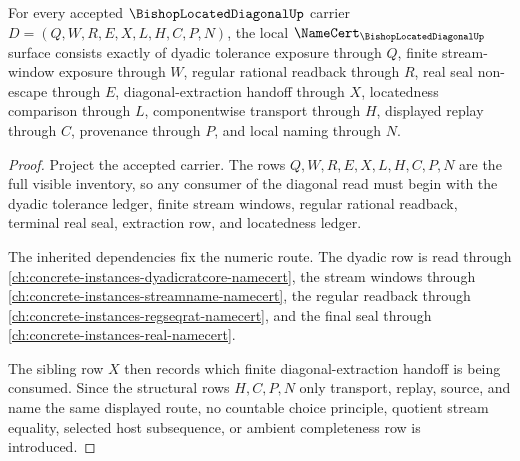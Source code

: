 \begin{theorem}
\label{thm:bishop-located-diagonal-namecert-obligations}
For every accepted $\BishopLocatedDiagonalUp$ carrier $D=(Q,W,R,E,X,L,H,C,P,N)$, the local $\NameCert_{\BishopLocatedDiagonalUp}$ surface consists exactly of dyadic tolerance exposure through $Q$, finite stream-window exposure through $W$, regular rational readback through $R$, real seal non-escape through $E$, diagonal-extraction handoff through $X$, locatedness comparison through $L$, componentwise transport through $H$, displayed replay through $C$, provenance through $P$, and local naming through $N$.
\end{theorem}
\begin{proof}
Project the accepted carrier. The rows $Q,W,R,E,X,L,H,C,P,N$ are the full visible inventory, so any consumer of the diagonal read must begin with the dyadic tolerance ledger, finite stream windows, regular rational readback, terminal real seal, extraction row, and locatedness ledger.

The inherited dependencies fix the numeric route. The dyadic row is read through \autoref{ch:concrete-instances-dyadicratcore-namecert}, the stream windows through \autoref{ch:concrete-instances-streamname-namecert}, the regular readback through \autoref{ch:concrete-instances-regseqrat-namecert}, and the final seal through \autoref{ch:concrete-instances-real-namecert}.

The sibling row $X$ then records which finite diagonal-extraction handoff is being consumed. Since the structural rows $H,C,P,N$ only transport, replay, source, and name the same displayed route, no countable choice principle, quotient stream equality, selected host subsequence, or ambient completeness row is introduced.
\end{proof}

